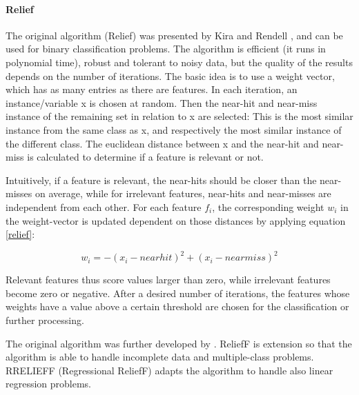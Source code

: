 \paragraph{Relief}
\label{par:methods.flat.filter.relief}

The original algorithm (Relief) was presented by Kira and Rendell \cite{Kira:92}, and can be used for binary classification problems. The algorithm is efficient (it runs in polynomial time), robust and tolerant to noisy data, but the quality of the results depends on the number of iterations.
The basic idea is to use a weight vector, which has as many entries as there are features. In each iteration, an instance/variable x is chosen at random. Then the near-hit and near-miss instance of the remaining set in relation to x are selected: This is the most similar instance from the same class as x, and respectively the most similar instance of the different class. The euclidean distance between x and the near-hit and near-miss is calculated to determine if a feature is relevant or not.  

Intuitively, if a feature is relevant, the near-hits should be closer than the near-misses on average, while for irrelevant features, near-hits and near-misses are independent from each other. 
For each feature $f_i$, the corresponding weight $w_i$ in the weight-vector is updated dependent on those distances by applying equation \ref{relief}:

\begin{equation}
\label{relief}
w_i = - (x_i - nearhit)^2  + (x_i - nearmiss)^2
\end{equation}

Relevant features thus score values larger than zero, while irrelevant features become zero or negative. After a desired number of iterations, the features whose weights have a value above a certain threshold are chosen for the classification or further processing.

The original algorithm was further developed by \cite{Kononenko:97}. ReliefF  is extension so that the algorithm is able to handle incomplete data and multiple-class problems. 
RRELIEFF (Regressional ReliefF) \cite{Robnik-Sikonja:97} adapts the algorithm to handle also linear regression problems.

